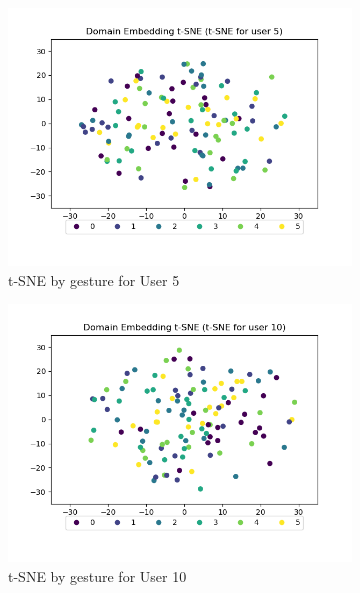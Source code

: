 \begin{figure}[b]
\begin{subfigure}{0.3\textwidth}
		\includegraphics[width=\textwidth]{figures/short/short_de_u5}
		\caption{t-SNE by gesture for User 5}
	\end{subfigure}
	\hfill
	\begin{subfigure}{0.3\textwidth}
		\centering
		\includegraphics[width=\textwidth]{figures/short/short_de_u10}
		\caption{t-SNE by gesture for User 10}
	\end{subfigure}
	\hfill
	\begin{subfigure}{0.3\textwidth}
		\centering

\end{subfigure}
\end{figure}
